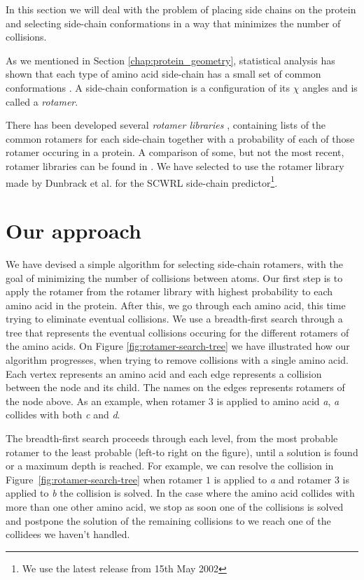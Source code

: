 In this section we will deal with the problem of placing side chains
on the protein and selecting side-chain conformations in a way that
minimizes the number of collisions.

As we mentioned in Section \ref{chap:protein_geometry}, statistical
analysis has shown that each type of amino acid side-chain has a small
set of common conformations \cite{dunbrack2002rotamer}. A side-chain
conformation is a configuration of its $\chi$ angles and is called a
\textit{rotamer}.

There has been developed several \textit{rotamer libraries}
\cite{dunbrack1997bayesian, lovell2000penultimate}, containing lists
of the common rotamers for each side-chain together with a probability
of each of those rotamer occuring in a protein. A comparison of some,
but not the most recent, rotamer libraries can be found in
\cite{dunbrack2002rotamer}. We have selected to use the rotamer
library made by Dunbrack et al. for the SCWRL side-chain
predictor\footnote{We use the latest release from 15th May 2002}.

\section{Our approach}
We have devised a simple algorithm for selecting side-chain rotamers,
with the goal of minimizing the number of collisions between
atoms. Our first step is to apply the rotamer from the rotamer library
with highest probability to each amino acid in the protein. After
this, we go through each amino acid, this time trying to eliminate
eventual collisions. We use a breadth-first search through a tree that
represents the eventual collisions occuring for the different rotamers
of the amino acids. On Figure \ref{fig:rotamer-search-tree} we have
illustrated how our algorithm progresses, when trying to remove
collisions with a single amino acid. Each vertex represents an amino
acid and each edge represents a collision between the node and its
child. The names on the edges represents rotamers of the node
above. As an example, when rotamer $3$ is applied to amino acid
\textit{a}, \textit{a} collides with both \textit{c} and \textit{d}.

The breadth-first search proceeds through each level, from the most
probable rotamer to the least probable (left-to right on the figure),
until a solution is found or a maximum depth is reached. For example,
we can resolve the collision in Figure~\ref{fig:rotamer-search-tree}
when rotamer $1$ is applied to \textit{a} and rotamer $3$ is applied
to \textit{b} the collision is solved. In the case where the amino
acid collides with more than one other amino acid, we stop as soon one
of the collisions is solved and postpone the solution of the remaining
collisions to we reach one of the collidees we haven't handled.


